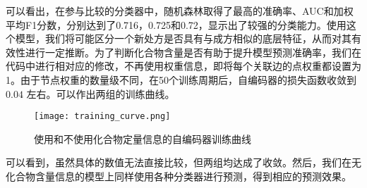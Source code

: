 可以看出，在参与比较的分类器中，随机森林取得了最高的准确率、AUC和加权平均F1分数，分别达到了0.716，0.725和0.72，显示出了较强的分类能力。使用这个模型，我们将可能区分一个新处方是否具有与成方相似的底层特征，从而对其有效性进行一定推断。为了判断化合物含量是否有助于提升模型预测准确率，我们在代码中进行相对应的修改，不再使用权重信息，即将每个关联边的点权重都设置为1。由于节点权重的数量级不同，在50个训练周期后，自编码器的损失函数收敛到 $0.04$ 左右。可以作出两组的训练曲线。

\begin{figure}[htbp]
  \centering
  \texttt{[image: training\_curve.png]}
  \caption{使用和不使用化合物定量信息的自编码器训练曲线}
  \label{fig:ae_train_curve}
\end{figure}

可以看到，虽然具体的数值无法直接比较，但两组均达成了收敛。然后，我们在无化合物含量信息的模型上同样使用各种分类器进行预测，得到相应的预测效果。

